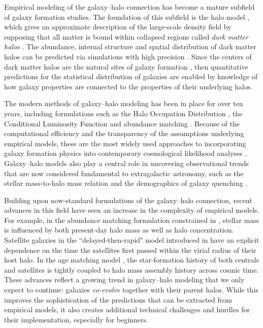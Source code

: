 \documentclass[twocolumn, tighten]{aastex6}
\begin{document}
Empirical modeling of the galaxy--halo connection has become a mature subfield of galaxy formation studies. The foundation of this subfield is the halo model \citep{mafry00,seljak00}, which gives an approximate description of the large-scale density field by supposing that all matter is bound within collapsed regions called {\em dark matter halos} \citep[see][for reviews]{cooray02,mo_vdb_white10}. The abundance, internal structure and spatial distribution of dark matter halos can be predicted via simulations with high precision \citep[e.g.,][]{tinker08a,tinker10,bhattacharya_etal11,bhattacharya_etal13,diemer_kravtsov15,heitmann_etal16}. Since the centers of dark matter halos are the natural sites of galaxy formation \citep{whiterees78}, then quantitative predictions for the statistical distribution of galaxies are enabled by knowledge of how galaxy properties are connected to the properties of their underlying halos. 

The modern methods of galaxy--halo modeling has been in place for over ten years, including formulations such as the Halo Occupation Distribution \citep[HOD, ][]{berlind02}, the Conditional Luminosity Function \citep[CLF,][]{yang03} and abundance matching \citep{kravtsov04a,vale_ostriker04,conroy06,vale_ostriker06}. Because of the computational efficiency and the transparency of the assumptions underlying empirical models, these are the most widely used approaches to incorporating galaxy formation physics into contemporary cosmological likelihood analyses \citep[e.g.,][]{cacciato_etal13, reid_etal14}. Galaxy--halo models also play a central role in uncovering observational trends that are now considered fundamental to extragalactic astronomy, such as the stellar mass-to-halo mass relation \citep{tinker05, vdBosch07, behroozi10, moster10, leauthaud_etal12} and the demographics of galaxy quenching \citep{vdBosch03a, collister05, behroozi13b, tinker_etal13}.

Building upon now-standard formulations of the galaxy--halo connection, recent advances in this field have seen an increase in the complexity of empirical models. For example, in the abundance matching formulation constrained in \citet{lehmann_etal15}, stellar mass is influenced by both present-day halo mass as well as halo concentration. Satellite galaxies in the ``delayed-then-rapid" model introduced in \citet{wetzel_etal12b} have an explicit dependence on the time the satellites first passed within the virial radius of their host halo. In the age matching model \citep{HW13a}, the star-formation history of both centrals and satellites is tightly coupled to halo mass assembly history across cosmic time. These advances reflect a growing trend in galaxy--halo modeling that we only expect to continue: galaxies {\em co-evolve} together with their parent halos. While this improves the sophistication of the predictions that can be extracted from empirical models, it also creates additional technical challenges and hurdles for their implementation, especially for beginners.
\end{document}
